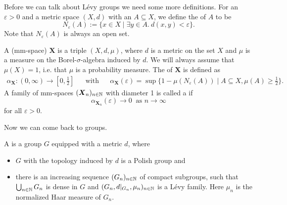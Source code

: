 

Before we can talk about L\'evy groups we need some more definitions. For an $\varepsilon>0$ and a metric space $(X,d)$ with an $A\subseteq X$, we define the  of $A$ to be 
\[N_\varepsilon(A):=\{x\in X\mid\exists y\in A.\  d(x,y)<\varepsilon\}.\]
Note that $N_\varepsilon(A)$ is always an open set.
\begin{definition}
A  (mm-space) $\boldsymbol{X}$ is a triple $(X,d,\mu)$, where $d$ is a metric on the set $X$ and $\mu$ is a measure on the Borel-$\sigma$-algebra induced by $d$. We will always assume that $\mu(X)=1$, i.e. that $\mu$ is a probability measure. 
The  of $\boldsymbol{X}$ is defined as 
\begin{align*}
\alpha_{\boldsymbol{X}}\colon(0,\infty)\to[0,\frac{1}{2}]&&\text{with}&&\alpha_{\boldsymbol{X}}(\varepsilon)=\sup\{1-\mu(N_\varepsilon(A))\mid A\subseteq X, \mu(A)\geq\frac{1}{2}\}.
\end{align*}
A family of mm-spaces $(\boldsymbol{X}_n)_{n\in\mathbb{N}}$ with diameter 1 is called a  if 
\[\alpha_{\boldsymbol{X}_n}(\varepsilon)\to 0\ \text{ as $n\to\infty$}\]
for all $\varepsilon>0$.
\end{definition}

Now we can come back to groups.
\begin{definition}\label{def:Levy}
A  is a group $G$ equipped with a metric $d$, where
\begin{itemize}
\item $G$ with the topology induced by $d$ is a Polish group and
\item there is an increasing sequence $(G_n)_{n\in\mathbb{N}}$ of compact subgroups, such that $\bigcup_{n\in\mathbb{N}} G_n$ is dense in $G$ and $(G_n,d|_{G_n},\mu_n)_{n\in\mathbb{N}}$ is a L\'evy family. Here $\mu_n$ is the normalized Haar measure of $G_n$.
\end{itemize}  
\end{definition}

